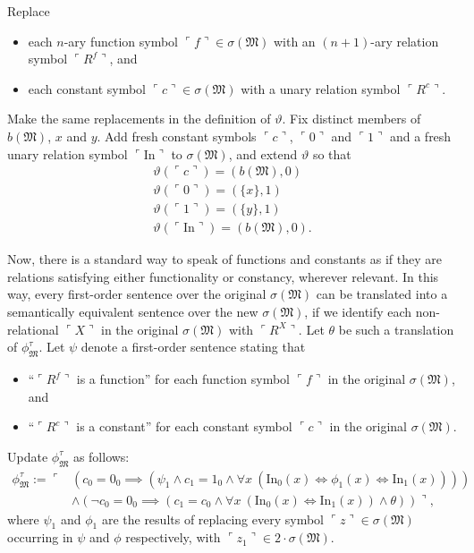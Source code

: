 \documentclass[12pt, twoside]{memoir}
\numberwithin{equation}{section}
\theoremstyle{definition}
\theoremstyle{remark}
\theoremstyle{definition}
\theoremstyle{definition}
\theoremstyle{definition}
\theoremstyle{remark}
\begin{document}
Replace
\begin{itemize}
    \item each $n$-ary function symbol $\ulcorner f \urcorner \in \sigma(\mathfrak{M})$ with an $(n+1)$-ary relation symbol $\ulcorner R^f \urcorner$, and
    \item each constant symbol $\ulcorner c \urcorner \in \sigma(\mathfrak{M})$ with a unary relation symbol $\ulcorner R^c \urcorner$.
\end{itemize}
Make the same replacements in the definition of $\vartheta$. Fix distinct members of $b(\mathfrak{M})$, $x$ and $y$. Add fresh constant symbols $\ulcorner c \urcorner$, $\ulcorner 0 \urcorner$ and $\ulcorner 1 \urcorner$ and a fresh unary relation symbol $\ulcorner \mathrm{In} \urcorner$ to $\sigma(\mathfrak{M})$, and extend $\vartheta$ so that
\begin{gather*}
    \vartheta(\ulcorner c \urcorner) = (b(\mathfrak{M}), 0) \\
    \vartheta(\ulcorner 0 \urcorner) = (\{x\}, 1) \\
    \vartheta(\ulcorner 1 \urcorner) = (\{y\}, 1) \\
    \vartheta(\ulcorner \mathrm{In} \urcorner) = (b(\mathfrak{M}), 0) \text{.}
\end{gather*}

Now, there is a standard way to speak of functions and constants as if they are relations satisfying either functionality or constancy, wherever relevant. In this way, every first-order sentence over the original $\sigma(\mathfrak{M})$ can be translated into a semantically equivalent sentence over the new $\sigma(\mathfrak{M})$, if we identify each non-relational $\ulcorner X \urcorner$ in the original $\sigma(\mathfrak{M})$ with $\ulcorner R^X \urcorner$. Let $\theta$ be such a translation of $\phi^{\tau}_{\mathfrak{M}}$. Let $\psi$ denote a first-order sentence stating that 
\begin{itemize}
    \item ``$\ulcorner R^f \urcorner$ is a function'' for each function symbol $\ulcorner f \urcorner$ in the original $\sigma(\mathfrak{M})$, and
    \item ``$\ulcorner R^c \urcorner$ is a constant'' for each constant symbol $\ulcorner c \urcorner$ in the original $\sigma(\mathfrak{M})$.
\end{itemize}
Update $\phi^{\tau}_{\mathfrak{M}}$ as follows: 
\begin{align*}
    \phi^{\tau}_{\mathfrak{M}} := \ulcorner & (c_0 = 0_0 \implies (\psi_1 \wedge c_1 = 1_0 \wedge \forall x \ (\mathrm{In}_0 (x) \iff \phi_1 (x) \iff \mathrm{In}_1 (x)))) \\
    & \wedge (\neg c_0 = 0_0 \implies (c_1 = c_0 \wedge \forall x \ (\mathrm{In}_0 (x) \iff \mathrm{In}_1 (x)) \wedge \theta)) \urcorner \text{,}
\end{align*}
where $\psi_1$ and $\phi_1$ are the results of replacing every symbol $\ulcorner z \urcorner \in \sigma(\mathfrak{M})$ occurring in $\psi$ and $\phi$ respectively, with $\ulcorner z_1 \urcorner \in 2 \cdot \sigma(\mathfrak{M})$. 
\end{document}
